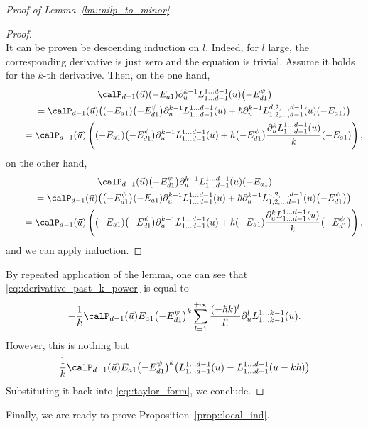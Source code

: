 \begin{proof}[Proof of Lemma~\ref{lm::nilp_to_minor}]
\begin{Lemma}
\begin{proof}
\[				\]
				It can be proven be descending induction on $l$. Indeed, for $l$ large, the corresponding derivative is just zero and the equation is trivial. Assume it holds for the $k$-th derivative. Then, on the one hand,
				\begin{gather*}
					\calP_{d-1}(\vec{u})(-E_{a1}) \partial_u^{k-1} L_{1\dots d-1}^{1\dots d-1}(u) \bigl(-E_{d1}^{\psi}\bigr) \\
				\qquad	= \calP_{d-1}(\vec{u})\bigl( (-E_{a1}) \bigl(-E_{d1}^{\psi}\bigr) \partial_u^{k-1} L_{1\dots d-1}^{1\dots d-1}(u) + \hbar \partial_u^{k-1} L_{1,2,\dots, d-1}^{d,2,\dots,d-1}(u) (-E_{a1}) \bigr) \\
					\qquad=\calP_{d-1}(\vec{u}) \left((-E_{a1}) \bigl(-E_{d1}^{\psi}\bigr) \partial_u^{k-1} L_{1\dots d-1}^{1\dots d-1}(u) + \hbar \bigl(-E_{d1}^{\psi}\bigr) \frac{\partial_u^k L_{1\dots d-1}^{1\dots d-1}(u)}{k} (-E_{a1}) \right),
				\end{gather*}
				on the other hand,
				\begin{gather*}
					\calP_{d-1}(\vec{u})\bigl(-E_{d1}^{\psi}\bigr) \partial_u^{k-1} L_{1\dots d-1}^{1\dots d-1}(u) (-E_{a1}) \\
					\qquad= \calP_{d-1}(\vec{u}) \bigl( \bigl(-E_{d1}^{\psi}\bigr) (-E_{a1}) \partial_u^{k-1} L_{1\dots d-1}^{1\dots d-1}(u) + \hbar \partial_u^{k-1} L_{1,2,\dots d-1}^{a,2,\dots,d-1}(u) \bigl(-E_{d1}^{\psi}\bigr) \bigr) \\
					\qquad=\calP_{d-1}(\vec{u}) \left((-E_{a1}) \bigl(-E_{d1}^{\psi}\bigr) \partial_u^{k-1} L_{1\dots d-1}^{1\dots d-1}(u) + \hbar (-E_{a1}) \frac{\partial_u^k L_{1\dots d-1}^{1\dots d-1}(u)}{k} \bigl(-E_{d1}^{\psi}\bigr) \right),
				\end{gather*}
				and we can apply induction.
			\end{proof}
		\end{Lemma}
		By repeated application of the lemma, one can see that \eqref{eq::derivative_past_k_power} is equal to
		\[
		-\frac{1}{k} \calP_{d-1}(\vec{u}) E_{a1} \bigl(-E_{d1}^{\psi}\bigr)^k \sum\limits_{l=1}^{+\infty} \frac{(-\hbar k)^l}{l!} \partial_u^l L_{1\dots k-1}^{1\dots k-1}(u).
		\]
		However, this is nothing but
		\[
		\frac{1}{k} \calP_{d-1}(\vec{u})E_{a1} \bigl(-E_{d1}^{\psi}\bigr)^k \bigl(L_{1\dots d-1}^{1\dots d-1}(u) - L_{1\dots d-1}^{1\dots d-1}(u-k\hbar)\bigr)
		\]
		Substituting it back into \eqref{eq::taylor_form}, we conclude.
	\end{proof}
	
	Finally, we are ready to prove Proposition~\ref{prop::local_ind}.
	
